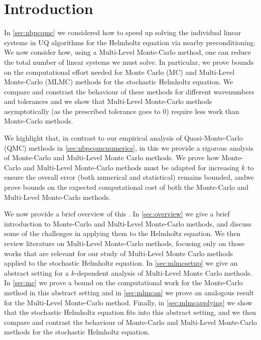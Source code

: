 \section{Introduction}

In \cref{sec:nbpcqmc} we considered how to speed up solving the individual linear systems in UQ algorithms for the Helmholtz equation via nearby preconditioning. We now consider how, using a Multi-Level Monte-Carlo method, one can reduce the total number of linear systems we must solve. In particular, we prove bounds on the computational effort needed for Monte Carlo (MC) and Multi-Level Monte-Carlo (MLMC) methods for the stochastic Helmholtz equation. We compare and constrast the behaviour of these methods for different wavenumbers and tolerances and we show that Multi-Level Monte-Carlo methods asymptotically (as the prescribed tolerance goes to 0) require less work than Monte-Carlo methods.

We highlight that, in contrast to our empirical analysis of Quasi-Monte-Carlo (QMC) methods in \cref{sec:nbpcqmcnumerics}, in this  we provide a rigorous analysis of Monte-Carlo and Multi-Level Monte Carlo methods. We prove how Monte-Carlo and Multi-Level Monte-Carlo methods must be adapted for increasing $k$ to ensure the overall error (both numerical and statistical) remains bounded, andwe prove bounds on the expected computational cost of both the Monte-Carlo and Multi-Level Monte-Carlo methods.

We now provide a brief overview of this . In \cref{sec:overview} we give a brief introduction to Monte-Carlo and Multi-Level Monte-Carlo methods, and discuss some of the challenges in applying them to the Helmholtz equation. We then review literature on Multi-Level Monte-Carlo methods, focusing only on those works that are relevant for our study of Multi-Level Monte Carlo methods applied to the stochastic Helmholtz equation. In \cref{sec:mlmcsetup} we give an abstract setting for a $k$-dependent analysis of Multi-Level Monte Carlo methods. In \cref{sec:mc} we prove a bound on the computational work for the Monte-Carlo method in this abstract setting and in \cref{sec:mlmcan} we prove an analogous result for the Multi-Level Monte-Carlo method. Finally, in \cref{sec:mlmcapplying} we show that the stochastic Helmholtz equation fits into this abstract setting, and we then compare and contrast the behaviour of Monte-Carlo and Multi-Level Monte-Carlo methods for the stochastic Helmholtz equation.

